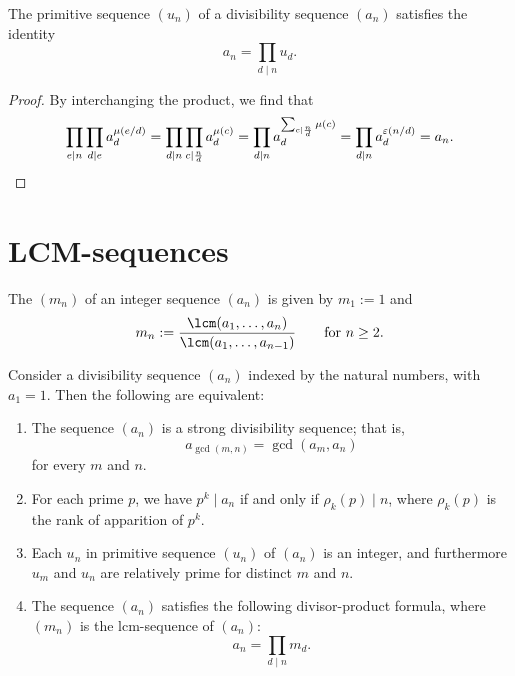 \begin{theorem}
  The primitive sequence $(u_n)$ of a divisibility sequence $(a_n)$ satisfies the identity
  \begin{equation*}
    a_n=\prod_{d\mid n} u_d.
  \end{equation*}
\end{theorem}

\begin{proof}
  By interchanging the product, we find that
  \begin{equation*}
    \prod_{e\mid n}\prod_{d\mid e} a_{d}^{\mu(e/d)}=\prod_{d\mid n}\prod_{c\mid\frac{n}{d}} a_{d}^{\mu(c)}=\prod_{d\mid n}a_d^{\sum_{c\mid\frac{n}{d}}\mu(c)}=\prod_{d\mid n}a_d^{\varepsilon(n/d)}=a_n. \qedhere
  \end{equation*}
\end{proof}

\section{LCM-sequences}

\begin{definition}
  The  $(m_n)$ of an integer sequence $(a_n)$ is given by $m_1:=1$ and
  \begin{equation*}
    m_n := \frac{\lcm(a_1,\ldots,a_n)}{\lcm(a_1,\ldots,a_{n-1})}\qquad\text{for $n\geq 2$}.
  \end{equation*}
\end{definition}

\begin{theorem}
  Consider a divisibility sequence $(a_n)$ indexed by the natural numbers, with $a_1=1$. Then the following are equivalent:
  \begin{enumerate}
  \item The sequence $(a_n)$ is a strong divisibility sequence; that is,
    \begin{equation*}
      a_{\gcd(m,n)}=\gcd(a_m,a_n)
    \end{equation*}
    for every $m$ and $n$.
  \item \textup{\cite{ward1936}} For each prime $p$, we have $p^k\mid a_n$ if and only if $\rho_k(p)\mid n$, where $\rho_k(p)$ is the rank of apparition of $p^k$.
  \item Each $u_n$ in primitive sequence $(u_n)$ of $(a_n)$ is an integer, and furthermore $u_m$ and $u_n$ are relatively prime for distinct $m$ and $n$.
  \item \textup{\cite{nowicki2015}} The sequence $(a_n)$ satisfies the following divisor-product formula, where $(m_n)$ is the lcm-sequence of $(a_n)$:
    \begin{equation*}
      a_n = \prod_{d\mid n}m_d.
    \end{equation*}
  \end{enumerate}
\end{theorem}

